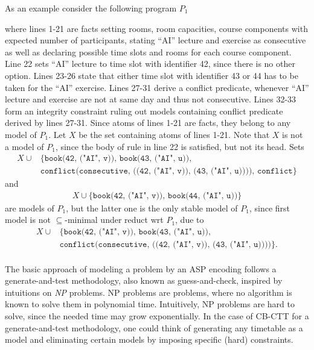 \documentclass{easychair}
\newcommand{\CBCTT}{CB-CTT}
\newcommand{\ASP}{ASP}
\begin{document}
  As an example consider the following program $P_1$
  
  where lines 1-21 are facts setting rooms, room capacities, course components with expected number of participants, stating ``AI'' lecture and exercise as consecutive as well as declaring possible time slots and rooms for each course component. 
  Line 22 sets ``AI'' lecture to time slot with identifier 42, since there is no other option. 
  Lines 23-26 state that either time slot with identifier 43 or 44 has to be taken for the ``AI'' exercise. 
  Lines 27-31 derive a conflict predicate, whenever ``AI'' lecture and exercise are not at same day and thus not consecutive. 
  Lines 32-33 form an integrity constraint ruling out models containing conflict predicate derived by lines 27-31. 
  Since atoms of lines 1-21 are facts, they belong to any model of $P_1$. 
  Let $X$ be the set containing atoms of lines 1-21. 
  Note that $X$ is not a model of $P_1$, since the body of rule in line 22 is satisfied, but not its head. 
  Sets 
  \begin{align*}
    X\cup&\{\texttt{book(42, ("AI", v)), book(43, ("AI", u)),} \\
         &\texttt{conflict(consecutive, ((42, ("AI", v)), (43, ("AI", u)))), conflict}\}
  \end{align*} 
  and 
  \begin{align*}
    X\cup\{\texttt{book(42, ("AI", v)), book(44, ("AI", u))}\}
  \end{align*} 
  are models of $P_1$, but the latter one is the only stable model of $P_1$, since first model is not $\subseteq$-minimal under reduct wrt $P_1$, due to 
  \begin{align*}
    X\cup&\{\texttt{book(42, ("AI", v)), book(43, ("AI", u)),} \\
         &\texttt{conflict(consecutive, ((42, ("AI", v)), (43, ("AI", u))))}\}.
  \end{align*} \\
  The basic approach of modeling a problem by an \ASP{} encoding follows a generate-and-test methodology, also known as guess-and-check, inspired by intuitions on \textit{NP} problems. 
  NP problems are problems, where no algorithm is known to solve them in polynomial time. 
  Intuitively, NP problems are hard to solve, since the needed time may grow exponentially. 
  In the case of \CBCTT{} for a generate-and-test methodology, one could think of generating any timetable as a model and eliminating certain models by imposing specific (hard) constraints.
\end{document}
